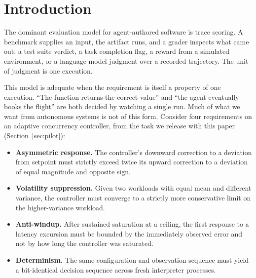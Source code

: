 \documentclass[sigconf,review,anonymous]{acmart}
\begin{document}
\maketitle

	
	\section{Introduction}
	
	The dominant evaluation model for agent-authored software is trace scoring.
	A benchmark supplies an input, the artifact runs, and a grader inspects what
	came out: a test suite verdict, a task completion flag, a reward from a
	simulated environment, or a language-model judgment over a recorded
	trajectory. The unit of judgment is one execution.
	
	This model is adequate when the requirement is itself a property of one
	execution. ``The function returns the correct value'' and ``the agent
	eventually books the flight'' are both decided by watching a single run.
	Much of what we want from autonomous systems is not of this form. Consider
	four requirements on an adaptive concurrency controller, from the task we
	release with this paper (Section~\ref{sec:pilot}):
	
	\begin{itemize}
		\item \textbf{Asymmetric response.} The controller's downward correction to
		a deviation from setpoint must strictly exceed twice its upward correction
		to a deviation of equal magnitude and opposite sign.
		\item \textbf{Volatility suppression.} Given two workloads with equal mean
		and different variance, the controller must converge to a strictly more
		conservative limit on the higher-variance workload.
		\item \textbf{Anti-windup.} After sustained saturation at a ceiling, the
		first response to a latency excursion must be bounded by the immediately
		observed error and not by how long the controller was saturated.
		\item \textbf{Determinism.} The same configuration and observation sequence
		must yield a bit-identical decision sequence across fresh interpreter
		processes.
	\end{itemize}
	
\end{document}
